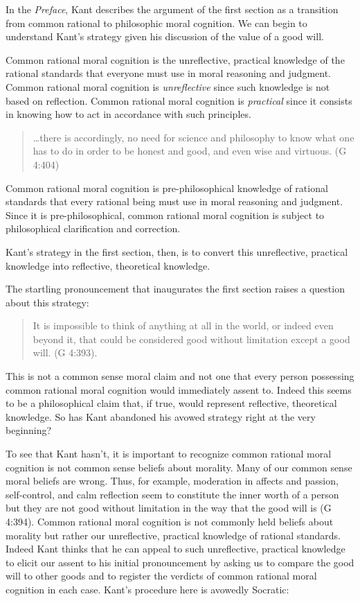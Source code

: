 In the \emph{Preface}, Kant describes the argument of the first section as a transition from common rational to philosophic moral cognition. We can begin to understand Kant’s strategy given his discussion of the value of a good will.

Common rational moral cognition is the unreflective, practical knowledge of the rational standards that everyone must use in moral reasoning and judgment. Common rational moral cognition is \emph{unreflective} since such knowledge is not based on reflection. Common rational moral cognition is \emph{practical} since it consists in knowing how to act in accordance with such principles.

\begin{quote}
	\ldots there is accordingly, no need for science and philosophy to know what one has to do in order to be honest and good, and even wise and virtuous. (G 4:404)
\end{quote}

Common rational moral cognition is pre-philosophical knowledge of rational standards that every rational being must use in moral reasoning and judgment. Since it is pre-philosophical, common rational moral cognition is subject to philosophical clarification and correction.

Kant’s strategy in the first section, then, is to convert this unreflective, practical knowledge into reflective, theoretical knowledge.

The startling pronouncement that inaugurates the first section raises a question about this strategy:

\begin{quote}
	It is impossible to think of anything at all in the world, or indeed even beyond it, that could be considered good without limitation except a good will. (G 4:393).
\end{quote}

This is not a common sense moral claim and not one that every person possessing common rational moral cognition would immediately assent to. Indeed this seems to be a philosophical claim that, if true, would represent reflective, theoretical knowledge. So has Kant abandoned his avowed strategy right at the very beginning?

To see that Kant hasn’t, it is important to recognize common rational moral cognition is not common sense beliefs about morality. Many of our common sense moral beliefs are wrong. Thus, for example, moderation in affects and passion, self-control, and calm reflection seem to constitute the inner worth of a person but they are not good without limitation in the way that the good will is (G 4:394). Common rational moral cognition is not commonly held beliefs about morality but rather our unreflective, practical knowledge of rational standards. Indeed Kant thinks that he can appeal to such unreflective, practical knowledge to elicit our assent to his initial pronouncement by asking us to compare the good will to other goods and to register the verdicts of common rational moral cognition in each case. Kant’s procedure here is avowedly Socratic:

